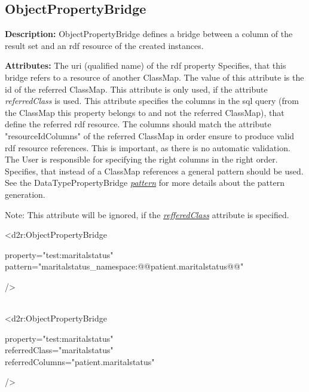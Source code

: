 \subsection{ObjectPropertyBridge}
\textbf{Description:} \newline
ObjectPropertyBridge defines a bridge between a column of the result set and an rdf resource of the created instances.

\textbf{Attributes:} \newline
{}
The uri (qualified name) of the rdf property
\EndAttribute
\label{refferedClassLabel}
Specifies, that this bridge refers to a resource of another ClassMap. 
The value of this attribute is the id of the referred ClassMap.
\EndAttribute
{}
This attribute is only used, if the attribute \emph{referredClass} is used.
This attribute specifies the columns in the sql query (from the ClassMap this property belongs to and not the referred ClassMap), that define the referred rdf resource. The columns should match the attribute "resourceIdColumns" of the referred ClassMap in order ensure to produce valid rdf resource references. This is important, as there is no automatic validation. The User is responsible for specifying the right columns in the right order.
\EndAttribute
{}
Specifies, that instead of a ClassMap references a general pattern should be used. See the DataTypePropertyBridge \hyperref[patternLabel]{\emph{pattern}} 
for more details about the pattern generation.

Note:\newline
This attribute will be ignored, if the
\hyperref[refferedClassLabel]{\emph{refferedClass}} attribute is specified.
\EndAttribute

\begin{ExampleBox}
	<d2r:ObjectPropertyBridge 
	\begin{indention}{1cm}
		property="test:maritalstatus"\\
		pattern="maritalstatus\_namespace:@@patient.maritalstatus@@"
	\end{indention}
	/>
	
	\\
	<d2r:ObjectPropertyBridge 
	\begin{indention}{1cm}
		property="test:maritalstatus"\\
		referredClass="maritalstatus"\\
		referredColumns="patient.maritalstatus"
	\end{indention}
	/>
\end{ExampleBox}